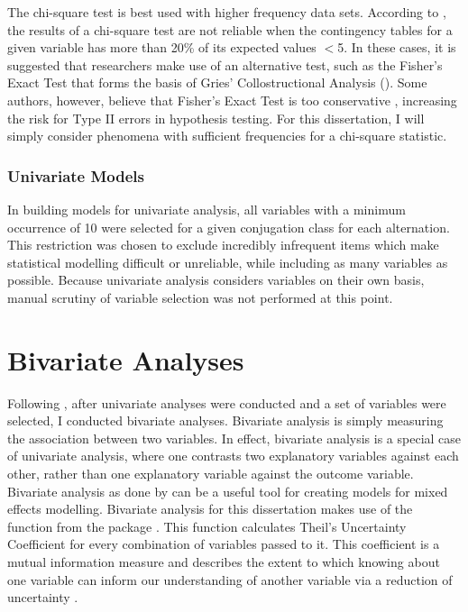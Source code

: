 The chi-square test is best used with higher frequency data sets. According to \citet{cochran1954some}, the results of a chi-square test are not reliable when the contingency tables for a given variable has more than 20\% of its expected values $<$5. In these cases, it is suggested that researchers make use of an alternative test, such as the Fisher's Exact Test that forms the basis of Gries' Collostructional Analysis (\citeyear{gries2004extending}). Some authors, however, believe that Fisher's Exact Test is too conservative \citep{dagostino}, increasing the risk for Type II errors in hypothesis testing. For this dissertation, I will simply consider phenomena with sufficient frequencies for a chi-square statistic.



\subsubsection{Univariate Models}
In building models for univariate analysis, all variables with a minimum occurrence of 10 were selected for a given conjugation class for each alternation. This restriction was chosen to exclude incredibly infrequent items which make statistical modelling difficult or unreliable, while including as many variables as possible. Because univariate analysis considers variables on their own basis, manual scrutiny of variable selection was not performed at this point. 

\section{Bivariate Analyses}
Following \citet{arppe2008univariate}, after univariate analyses were conducted and a set of variables were selected, I conducted bivariate analyses. Bivariate analysis is simply measuring the association between two variables. In effect, bivariate analysis is a special case of univariate analysis, where one contrasts two explanatory variables against each other, rather than one explanatory variable against the outcome variable. Bivariate analysis as done by \citet{arppe2008univariate} can be a useful tool for creating models for mixed effects modelling. Bivariate analysis for this dissertation makes use of the  function from the  package \citep{polytomous}. This function calculates Theil's Uncertainty Coefficient \citep{theil} for every combination of variables passed to it. This coefficient is a mutual information measure and describes the extent to which knowing about one variable can inform our understanding of another variable via a reduction of uncertainty \citep[90]{arppe2008univariate}. 


